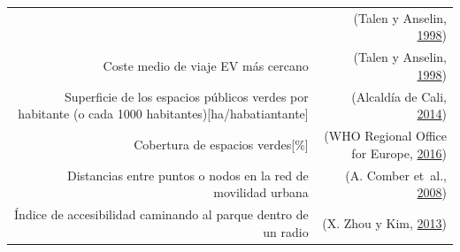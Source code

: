 \documentclass[12pt,a4paper,openany]{book}
\theoremstyle{definition}
\theoremstyle{definition}
\theoremstyle{definition}
\theoremstyle{remark}
\begin{document}
\begin{longtable}[]{@{}rr@{}}
\begin{minipage}[t]{0.57\columnwidth}
\end{minipage} & \begin{minipage}[t]{0.31\columnwidth}\raggedleft\strut
(Talen y Anselin,
\protect\hyperlink{ref-talen_assessing_1998}{1998})\strut
\end{minipage}\tabularnewline
\begin{minipage}[t]{0.57\columnwidth}\raggedleft\strut
Coste medio de viaje EV más cercano\strut
\end{minipage} & \begin{minipage}[t]{0.31\columnwidth}\raggedleft\strut
(Talen y Anselin,
\protect\hyperlink{ref-talen_assessing_1998}{1998})\strut
\end{minipage}\tabularnewline
\begin{minipage}[t]{0.57\columnwidth}\raggedleft\strut
Superficie de los espacios públicos verdes por habitante (o cada 1000
habitantes){[}ha/habatiantante{]}\strut
\end{minipage} & \begin{minipage}[t]{0.31\columnwidth}\raggedleft\strut
(Alcaldía de Cali, \protect\hyperlink{ref-pot2014cali}{2014})\strut
\end{minipage}\tabularnewline
\begin{minipage}[t]{0.57\columnwidth}\raggedleft\strut
Cobertura de espacios verdes{[}\%{]}\strut
\end{minipage} & \begin{minipage}[t]{0.31\columnwidth}\raggedleft\strut
(WHO Regional Office for Europe,
\protect\hyperlink{ref-who2016urban}{2016})\strut
\end{minipage}\tabularnewline
\begin{minipage}[t]{0.57\columnwidth}\raggedleft\strut
Distancias entre puntos o nodos en la red de movilidad urbana\strut
\end{minipage} & \begin{minipage}[t]{0.31\columnwidth}\raggedleft\strut
(A. Comber et~al.,
\protect\hyperlink{ref-comber_using_2008}{2008})\strut
\end{minipage}\tabularnewline
\begin{minipage}[t]{0.57\columnwidth}\raggedleft\strut
Índice de accesibilidad caminando al parque dentro de un radio\strut
\end{minipage} & \begin{minipage}[t]{0.31\columnwidth}\raggedleft\strut
(X. Zhou y Kim, \protect\hyperlink{ref-zhou_social_2013}{2013})\strut
\end{minipage}\tabularnewline
\bottomrule
\end{longtable}
\end{document}
